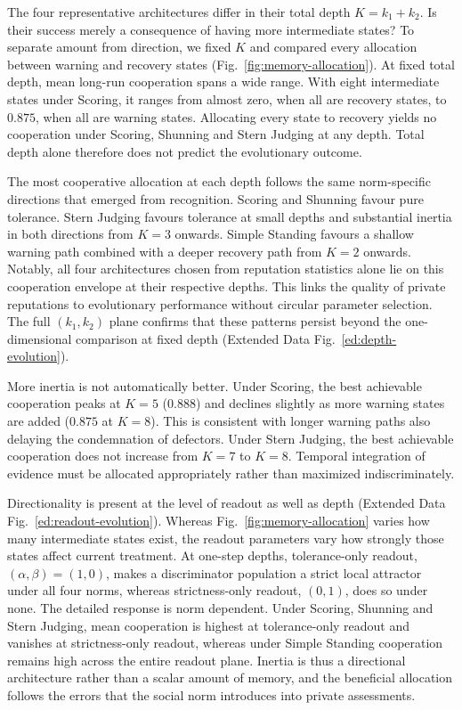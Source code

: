 \documentclass[fleqn,10pt]{article}
\begin{document}
The four representative architectures differ in their total depth $K=k_1+k_2$. Is their success merely a consequence of having more intermediate states? To separate amount from direction, we fixed $K$ and compared every allocation between warning and recovery states (Fig.~\ref{fig:memory-allocation}). At fixed total depth, mean long-run cooperation spans a wide range. With eight intermediate states under Scoring, it ranges from almost zero, when all are recovery states, to $0.875$, when all are warning states. Allocating every state to recovery yields no cooperation under Scoring, Shunning and Stern Judging at any depth. Total depth alone therefore does not predict the evolutionary outcome.

The most cooperative allocation at each depth follows the same norm-specific directions that emerged from recognition. Scoring and Shunning favour pure tolerance. Stern Judging favours tolerance at small depths and substantial inertia in both directions from $K=3$ onwards. Simple Standing favours a shallow warning path combined with a deeper recovery path from $K=2$ onwards. Notably, all four architectures chosen from reputation statistics alone lie on this cooperation envelope at their respective depths. This links the quality of private reputations to evolutionary performance without circular parameter selection. The full $(k_1,k_2)$ plane confirms that these patterns persist beyond the one-dimensional comparison at fixed depth (Extended Data Fig.~\ref{ed:depth-evolution}).

More inertia is not automatically better. Under Scoring, the best achievable cooperation peaks at $K=5$ ($0.888$) and declines slightly as more warning states are added ($0.875$ at $K=8$). This is consistent with longer warning paths also delaying the condemnation of defectors. Under Stern Judging, the best achievable cooperation does not increase from $K=7$ to $K=8$. Temporal integration of evidence must be allocated appropriately rather than maximized indiscriminately.

Directionality is present at the level of readout as well as depth (Extended Data Fig.~\ref{ed:readout-evolution}). Whereas Fig.~\ref{fig:memory-allocation} varies how many intermediate states exist, the readout parameters vary how strongly those states affect current treatment. At one-step depths, tolerance-only readout, $(\alpha,\beta)=(1,0)$, makes a discriminator population a strict local attractor under all four norms, whereas strictness-only readout, $(0,1)$, does so under none. The detailed response is norm dependent. Under Scoring, Shunning and Stern Judging, mean cooperation is highest at tolerance-only readout and vanishes at strictness-only readout, whereas under Simple Standing cooperation remains high across the entire readout plane. Inertia is thus a directional architecture rather than a scalar amount of memory, and the beneficial allocation follows the errors that the social norm introduces into private assessments.
\end{document}
